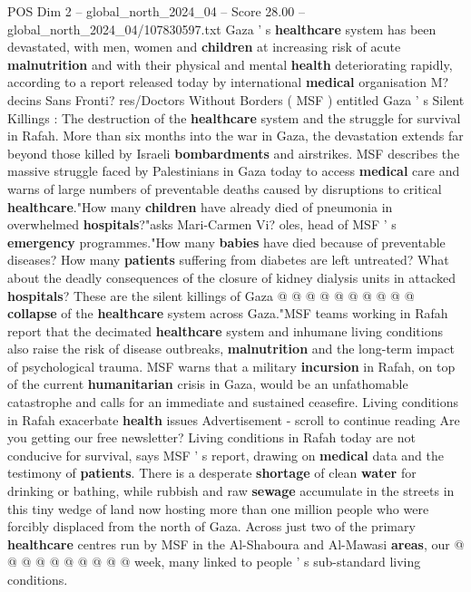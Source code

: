 \begin{textsample}{POS Dim 2 – global\_north\_2024\_04 – Score 28.00 – global\_north\_2024\_04/107830597.txt}  \label{ex:f2_pos_264}
Gaza ' s \textbf{healthcare} system has been devastated, with men, women and \textbf{children} at increasing risk of acute \textbf{malnutrition} and with their physical and mental \textbf{health} deteriorating rapidly, according to a report released today by international \textbf{medical} organisation M? decins Sans Fronti? res/Doctors Without Borders ( MSF ) entitled Gaza ' s Silent Killings : The destruction of the \textbf{healthcare} system and the struggle for survival in Rafah.
More than six months into the war in Gaza, the devastation extends far beyond those killed by Israeli \textbf{bombardments} and airstrikes.
MSF describes the massive struggle faced by Palestinians in Gaza today to access \textbf{medical} care and warns of large numbers of preventable deaths caused by disruptions to critical \textbf{healthcare}."How many \textbf{children} have already died of pneumonia in overwhelmed \textbf{hospitals}?"asks Mari-Carmen Vi? oles, head of MSF ' s \textbf{emergency} programmes."How many \textbf{babies} have died because of preventable diseases?
How many \textbf{patients} suffering from diabetes are left untreated?
What about the deadly consequences of the closure of kidney dialysis units in attacked \textbf{hospitals}?
These are the silent killings of Gaza @ @ @ @ @ @ @ @ @ @ \textbf{collapse} of the \textbf{healthcare} system across Gaza."MSF teams working in Rafah report that the decimated \textbf{healthcare} system and inhumane living conditions also raise the risk of disease outbreaks, \textbf{malnutrition} and the long-term impact of psychological trauma.
MSF warns that a military \textbf{incursion} in Rafah, on top of the current \textbf{humanitarian} crisis in Gaza, would be an unfathomable catastrophe and calls for an immediate and sustained ceasefire.
Living conditions in Rafah exacerbate \textbf{health} issues Advertisement - scroll to continue reading Are you getting our free newsletter?
Living conditions in Rafah today are not conducive for survival, says MSF ' s report, drawing on \textbf{medical} data and the testimony of \textbf{patients}.
There is a desperate \textbf{shortage} of clean \textbf{water} for drinking or bathing, while rubbish and raw \textbf{sewage} accumulate in the streets in this tiny wedge of land now hosting more than one million people who were forcibly displaced from the north of Gaza.
Across just two of the primary \textbf{healthcare} centres run by MSF in the Al-Shaboura and Al-Mawasi \textbf{areas}, our @ @ @ @ @ @ @ @ @ @ week, many linked to people ' s sub-standard living conditions.

\end{textsample}
